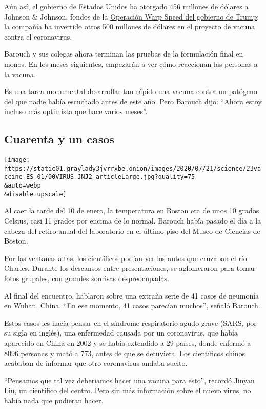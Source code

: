 Aún así, el gobierno de Estados Unidos ha otorgado 456 millones de
dólares a Johnson \& Johnson, fondos de la
\href{https://www.hhs.gov/about/news/2020/06/16/fact-sheet-explaining-operation-warp-speed.html}{Operación
Warp Speed del gobierno de Trump}; la compañía ha invertido otros 500
millones de dólares en el proyecto de vacuna contra el coronavirus.

Barouch y sus colegas ahora terminan las pruebas de la formulación final
en monos. En los meses siguientes, empezarán a ver cómo reaccionan las
personas a la vacuna.

Es una tarea monumental desarrollar tan rápido una vacuna contra un
patógeno del que nadie había escuchado antes de este año. Pero Barouch
dijo: ``Ahora estoy incluso más optimista que hace varios meses''.

\hypertarget{cuarenta-y-un-casos}{%
\subsection{Cuarenta y un casos}\label{cuarenta-y-un-casos}}

\texttt{[image: https://static01.graylady3jvrrxbe.onion/images/2020/07/21/science/23vaccine-ES-01/00VIRUS-JNJ2-articleLarge.jpg?quality=75\\\&auto=webp\\\&disable=upscale]}

Al caer la tarde del 10 de enero, la temperatura en Boston era de unos
10 grados Celsius, casi 11 grados por encima de lo normal. Barouch había
pasado el día a la cabeza del retiro anual del laboratorio en el último
piso del Museo de Ciencias de Boston.

Por las ventanas altas, los científicos podían ver los autos que
cruzaban el río Charles. Durante los descansos entre presentaciones, se
aglomeraron para tomar fotos grupales, con grandes sonrisas
despreocupadas.

Al final del encuentro, hablaron sobre una extraña serie de 41 casos de
neumonía en Wuhan, China. ``En ese momento, 41 casos parecían muchos'',
señaló Barouch.

Estos casos les hacía pensar en el síndrome respiratorio agudo grave
(SARS, por su sigla en inglés), una enfermedad causada por un
coronavirus, que había aparecido en China en 2002 y se había extendido a
29 países, donde enfermó a 8096 personas y mató a 773, antes de que se
detuviera. Los científicos chinos acababan de informar que otro
coronavirus andaba suelto.

``Pensamos que tal vez deberíamos hacer una vacuna para esto'', recordó
Jinyan Liu, un científico del centro. Pero sin más información sobre el
nuevo virus, no había nada que pudieran hacer.

